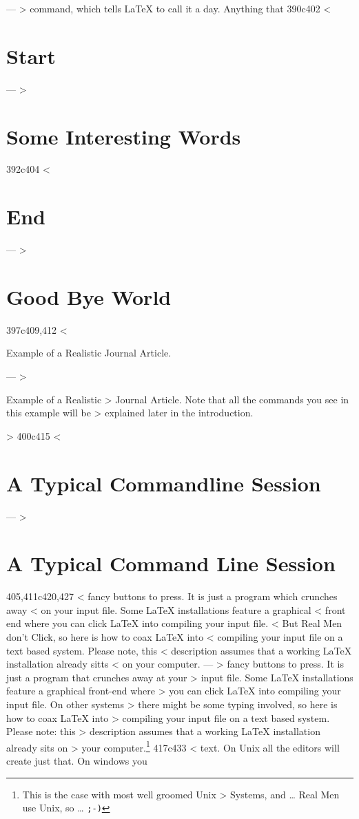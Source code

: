 ---
> command, which tells \LaTeX{} to call it a day. Anything that
390c402
< \section{Start}
---
> \section{Some Interesting Words}
392c404
< \section{End}
---
> \section{Good Bye World}
397c409,412
< \caption{Example of a Realistic Journal Article.} \label{document}
---
> \caption[Example of a Realistic Journal Article.]{Example of a Realistic
> Journal Article. Note that all the commands you see in this example will be
> explained later in the introduction.} \label{document}
> 
400c415
< \section{A Typical Commandline Session}
---
> \section{A Typical Command Line Session}
405,411c420,427
< fancy buttons to press. It is just a program which crunches away
< on your input file. Some \LaTeX{} installations feature a graphical
< front end where you can click \LaTeX{} into compiling your input file.
< But Real Men don't Click, so here is how to coax \LaTeX{} into
< compiling your input file on a text based system. Please note, this
< description assumes that a working \LaTeX{} installation already sitts
< on your computer.
---
> fancy buttons to press. It is just a program that crunches away at your
> input file. Some \LaTeX{} installations feature a graphical front-end where
> you can click \LaTeX{} into compiling your input file. On other systems
> there might be some typing involved, so here is how to coax \LaTeX{} into
> compiling your input file on a text based system. Please note: this
> description assumes that a working \LaTeX{} installation already sits on
> your computer.\footnote{This is the case with most well groomed Unix
> Systems, and \ldots{} Real Men use Unix, so \ldots{} \texttt{;-)}}
417c433
<   text.  On Unix all the editors will create just that. On windows you
